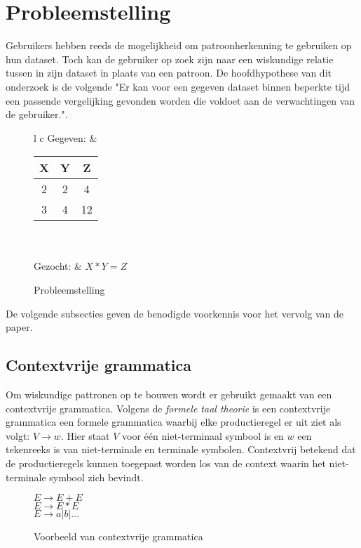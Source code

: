 \documentclass[Main.tex]{subfiles}
\begin{document}
\section{Probleemstelling}
Gebruikers hebben reeds de mogelijkheid om patroonherkenning te gebruiken op hun dataset. Toch kan de gebruiker op zoek zijn naar een wiskundige relatie tussen in zijn dataset in plaats van een patroon. De hoofdhypothese van dit onderzoek is de volgende "Er kan voor een gegeven dataset binnen beperkte tijd een passende vergelijking gevonden worden die voldoet aan de verwachtingen van de gebruiker.". 

\begin{figure}[!htb]
\centering
\begin{framed}
\begin{tabular}{l c}
Gegeven: &
\begin{tabular}{| c | c | | c |}
\hline
X & Y & Z \\ \hline
2 & 2 & 4 \\ \hline
3 & 4 &12 \\ \hline
\end{tabular} \\ \\
Gezocht: & $X*Y = Z$
\end{tabular}
\end{framed}
\caption{Probleemstelling}
\label{fig:psvb}
\end{figure}

\par De volgende subsecties geven de benodigde voorkennis voor het vervolg van de paper. 

 

\subsection{Contextvrije grammatica}
Om wiskundige pattronen op te bouwen wordt er gebruikt gemaakt van een contextvrije grammatica.\cite{equationDisc} Volgens de \textit{formele taal theorie} \cite{cfg} is een contextvrije grammatica een formele grammatica waarbij elke productieregel er uit ziet als volgt: $V \rightarrow w$. Hier staat $V$  voor \'e\'en niet-terminaal symbool is en $w$ een tekenreeks is van niet-terminale en terminale symbolen. Contextvrij betekend dat de productieregels kunnen toegepast worden los van de context waarin het niet-terminale symbool zich bevindt. \\

\begin{figure}[!htb]
\centering
\begin{framed}
$E \rightarrow E + E$ \\
$E \rightarrow E \ast E$ \\
$E \rightarrow a | b | \dotsc$
\end{framed}
\caption{Voorbeeld van contextvrije grammatica}
\label{fig:cfg}
\end{figure}
\end{document}
